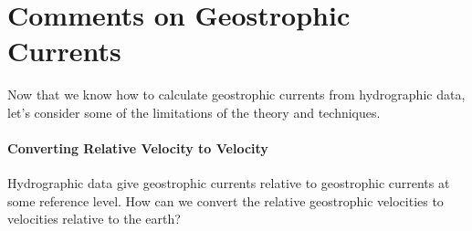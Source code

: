 \vspace{-2ex}
\section{Comments on Geostrophic Currents}
Now that we know how to calculate geostrophic currents
from hydrographic data, let's consider some
of the limitations of the theory and techniques.
\paragraph{Converting Relative Velocity to Velocity}
Hydrographic data give geo\-stro\-phic
currents relative to geostrophic currents
at some reference level. How can we convert the relative geostrophic velocities to velocities
relative to the earth?

